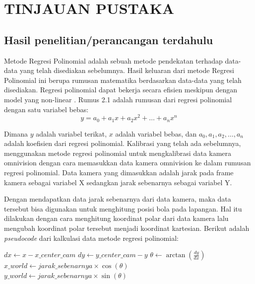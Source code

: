 \chapter{TINJAUAN PUSTAKA}
\label{chap:tinjauanpustaka}

\section{Hasil penelitian/perancangan terdahulu}
Metode Regresi Polinomial adalah sebuah metode pendekatan terhadap data-data yang telah disediakan sebelumnya. Hasil keluaran dari metode Regresi Polinomial ini berupa rumusan matematika berdasarkan data-data yang telah disediakan. Regresi polinomial dapat bekerja secara efisien meskipun dengan model yang non-linear 
\parencite{ref_regresi}. Rumus 2.1 adalah rumusan dari regresi polinomial dengan satu variabel bebas: 
\begin{equation}
  y = a_0 + a_1x + a_2x^2 + \ldots + a_nx^n
\end{equation}

Dimana \(y\) adalah variabel terikat, \(x\) adalah variabel bebas, dan \(a_0, a_1, a_2, \ldots, a_n\) adalah koefisien dari regresi polinomial. Kalibrasi yang telah ada sebelumnya, menggunakan metode regresi polinomial untuk mengkalibrasi data kamera omnivision dengan cara memasukkan data kamera omnivision ke dalam rumusan regresi polinomial. Data kamera yang dimasukkan adalah jarak pada frame kamera sebagai variabel X sedangkan jarak sebenarnya sebagai variabel Y. 

Dengan mendapatkan data jarak sebenarnya dari data kamera, maka data tersebut bisa digunakan untuk menghitung posisi bola pada lapangan. Hal itu dilakukan dengan cara menghitung koordinat polar dari data kamera lalu mengubah koordinat polar tersebut menjadi koordinat kartesian. Berikut adalah \textit{pseudocode} dari kalkulasi data metode regresi polinomial:
\begin{algorithm}
  \caption{Kalkulasi data metode regresi polinomial}\label{alg:calculate_coordinates}
  \begin{algorithmic}[1]
      \State {} $dx \gets x - x\_center\_cam$
      \State {} $dy \gets y\_center\_cam - y$
      \State {} $\theta \gets \arctan(\frac{dy}{dx})$
      \State {} $x\_world \gets jarak\_sebenarnya \times \cos(\theta)$
      \State {} $y\_world \gets jarak\_sebenarnya \times \sin(\theta)$
  \EndProcedure
  \end{algorithmic}
\end{algorithm}

